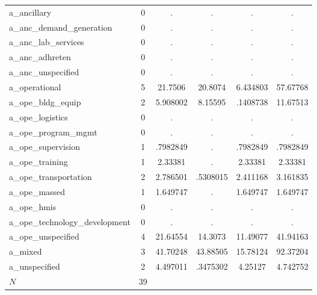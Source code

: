 \begin{table}[htbp]
\begin{tabular}{l*{1}{ccccc}}
a\_ancillary &           0&           .&           .&           .&           .\\
a\_anc\_demand\_generation&           0&           .&           .&           .&           .\\
a\_anc\_lab\_services&           0&           .&           .&           .&           .\\
a\_anc\_adhreten&           0&           .&           .&           .&           .\\
a\_anc\_unspecified&           0&           .&           .&           .&           .\\
a\_operational&           5&     21.7506&     20.8074&    6.434803&    57.67768\\
a\_ope\_bldg\_equip&           2&    5.908002&     8.15595&    .1408738&    11.67513\\
a\_ope\_logistics&           0&           .&           .&           .&           .\\
a\_ope\_program\_mgmt&           0&           .&           .&           .&           .\\
a\_ope\_supervision&           1&    .7982849&           .&    .7982849&    .7982849\\
a\_ope\_training&           1&     2.33381&           .&     2.33381&     2.33381\\
a\_ope\_transportation&           2&    2.786501&    .5308015&    2.411168&    3.161835\\
a\_ope\_massed&           1&    1.649747&           .&    1.649747&    1.649747\\
a\_ope\_hmis  &           0&           .&           .&           .&           .\\
a\_ope\_technology\_development&           0&           .&           .&           .&           .\\
a\_ope\_unspecified&           4&    21.64554&     14.3073&    11.49077&    41.94163\\
a\_mixed     &           3&    41.70248&    43.88505&    15.78124&    92.37204\\
a\_unspecified&           2&    4.497011&    .3475302&     4.25127&    4.742752\\
\hline
\(N\)       &          39&            &            &            &            \\
\hline\hline
\end{tabular}
\end{table}
